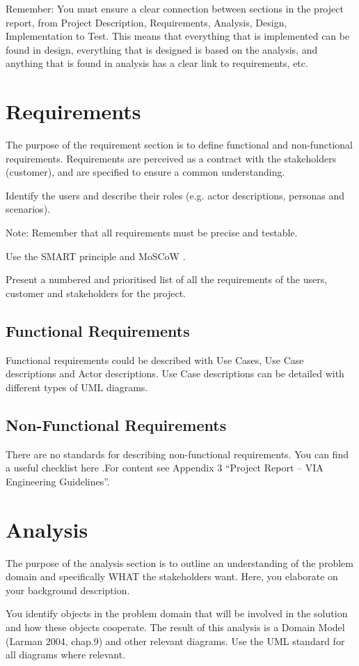 \documentclass{article}
\begin{document}
	Remember: You must ensure a clear connection between sections in the project report, from Project Description, Requirements, Analysis, Design, Implementation to Test. This means that everything that is implemented can be found in design, everything that is designed is based on the analysis, and anything that is found in analysis has a clear link to requirements, etc.
	
	\newpage
	\section{Requirements}
	The purpose of the requirement section is to define functional and non-functional requirements. Requirements are perceived as a contract with the stakeholders (customer), and are specified to ensure a common understanding.
	
	Identify the users and describe their roles (e.g. actor descriptions, personas and scenarios).
	
	Note: Remember that all requirements must be precise and testable.
	
	Use the SMART principle \autocite{yc} and MoSCoW \autocite{msc13}.
	
	Present a numbered and prioritised list of all the requirements of the users, customer and stakeholders for the project.
	\subsection{Functional Requirements}
	Functional requirements could be described with Use Cases, Use Case descriptions and Actor descriptions. Use Case descriptions can be detailed with different types of UML diagrams.
	\subsection{Non-Functional Requirements}
	There are no standards for describing non-functional requirements. You can find a useful checklist here \autocite{db14}.For content see Appendix 3 “Project Report – VIA Engineering Guidelines”.
	\newpage
	\section{Analysis}
	The purpose of the analysis section is to outline an understanding of the problem domain and specifically WHAT the stakeholders want. Here, you elaborate on your background description.
	
	You identify objects in the problem domain that will be involved in the solution and how these objects cooperate. The result of this analysis is a Domain Model (Larman 2004, chap.9) and other relevant diagrams.
	Use the UML standard for all diagrams where relevant.
	
\end{document}
